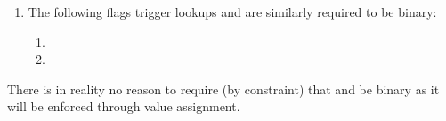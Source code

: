 \begin{enumerate}
\begin{enumerate}
			\item \txnDataHubRequiresEvmExecution   {}
			\item \txnDataHubCopyTxcd               {}
			\item \txnDataHubStatusCode             {}
			\item \txnDataHubEipBeaconRoot          {}
			\item \txnDataHubEipBlockHash           {}
		\end{enumerate}
	\item
		The following flags trigger lookups and are similarly required to be binary:
		\begin{enumerate}
			\item \txnDataCmptnEucFlag{}
			\item \txnDataCmptnWcpFlag{}
		\end{enumerate}
\end{enumerate}
\saNote{}
There is in reality no reason to require (by constraint) that \txCopyTxcd{} and \isLastTxOfBlock{} be binary as it will be enforced through value assignment.
